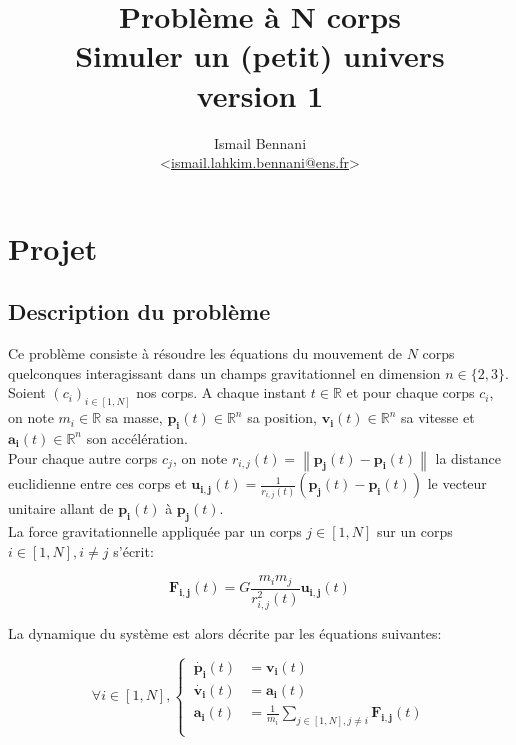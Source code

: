 \documentclass{article}
\title{\textbf{Problème à N corps} \\
       \Large Simuler un (petit) univers\\
       \small version 1}
\author{Ismail Bennani \\
        <\href{mailto:ismail.lahkim.bennani@ens.fr}{ismail.lahkim.bennani@ens.fr}>}
\date{}
\newcommand{\norm}[1]{\left\lVert#1\right\rVert}
\newcommand{\myvec}[1]{\ensuremath{\mathbf{#1}}}
\begin{document}
\maketitle

\section{Projet}
\label{projet}

\subsection{Description du problème}

Ce problème consiste à résoudre les équations du mouvement de $N$ corps quelconques interagissant dans un champs gravitationnel en dimension ${n\in \{ 2,3 \}}$. \\
Soient $(c_i)_{i\in[1,N]}$ nos corps. A chaque instant $t \in \mathbb{R}$ et pour chaque corps $c_i$, on note $m_i \in \mathbb{R}$ sa masse, $\myvec{p_i}(t) \in \mathbb{R}^n$ sa position, $\myvec{v_i}(t) \in \mathbb{R}^n$ sa vitesse et $\myvec{a_i}(t) \in \mathbb{R}^n$ son accélération.\\
Pour chaque autre corps $c_j$, on note $r_{i,j}(t) = \norm{\myvec{p_j}(t) - \myvec{p_i}(t)}$ la distance euclidienne entre ces corps et $\myvec{u_{i,j}}(t) = \frac{1}{r_{i,j}(t)}(\myvec{p_j}(t)-\myvec{p_i}(t))$ le vecteur unitaire allant de $\myvec{p_i}(t)$ à $\myvec{p_j}(t)$.\\

La force gravitationnelle appliquée par un corps $j \in [1,N]$ sur un corps $i \in [1,N], i \ne j$ s'écrit:

\begin{equation*}
    \myvec{F_{i,j}}(t) = G \frac{m_im_j}{r^2_{i,j}(t)} \myvec{u_{i,j}}(t)
\end{equation*}

La dynamique du système est alors décrite par les équations suivantes:

\begin{equation*}
\forall i \in [1,N], \left\{\begin{aligned}
    \ \myvec{\dot{p_i}}(t) & = \myvec{v_i}(t) \\
    \ \myvec{\dot{v_i}}(t) & = \myvec{a_i}(t) \\
    \ \myvec{a_i}(t) & = \frac{1}{m_i} \sum_{j \in [1,N], j \ne i} \myvec{F_{i,j}}(t) \\
\end{aligned}\right.
\end{equation*}
\end{document}
